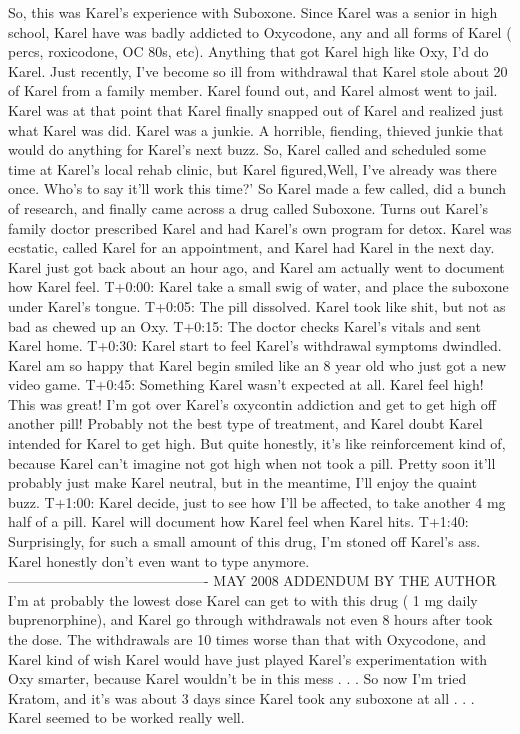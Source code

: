 \documentclass[12pt]{book}
\begin{document}
So, this was Karel's experience with Suboxone. Since Karel was a senior in high school, Karel have was badly addicted to Oxycodone, any and all forms of Karel ( percs, roxicodone, OC 80s, etc). Anything that got Karel high like Oxy, I'd do Karel. Just recently, I've become so ill from withdrawal that Karel stole about 20 of Karel from a family member. Karel found out, and Karel almost went to jail. Karel was at that point that Karel finally snapped out of Karel and realized just what Karel was did. Karel was a junkie. A horrible, fiending, thieved junkie that would do anything for Karel's next buzz. So, Karel called and scheduled some time at Karel's local rehab clinic, but Karel figured,Well, I've already was there once. Who's to say it'll work this time?' So Karel made a few called, did a bunch of research, and finally came across a drug called Suboxone. Turns out Karel's family doctor prescribed Karel and had Karel's own program for detox. Karel was ecstatic, called Karel for an appointment, and Karel had Karel in the next day. Karel just got back about an hour ago, and Karel am actually went to document how Karel feel. T+0:00: Karel take a small swig of water, and place the suboxone under Karel's tongue. T+0:05: The pill dissolved. Karel took like shit, but not as bad as chewed up an Oxy. T+0:15: The doctor checks Karel's vitals and sent Karel home. T+0:30: Karel start to feel Karel's withdrawal symptoms dwindled. Karel am so happy that Karel begin smiled like an 8 year old who just got a new video game. T+0:45: Something Karel wasn't expected at all. Karel feel high! This was great! I'm got over Karel's oxycontin addiction and get to get high off another pill! Probably not the best type of treatment, and Karel doubt Karel intended for Karel to get high. But quite honestly, it's like reinforcement kind of, because Karel can't imagine not got high when not took a pill. Pretty soon it'll probably just make Karel neutral, but in the meantime, I'll enjoy the quaint buzz. T+1:00: Karel decide, just to see how I'll be affected, to take another 4 mg half of a pill. Karel will document how Karel feel when Karel hits. T+1:40: Surprisingly, for such a small amount of this drug, I'm stoned off Karel's ass. Karel honestly don't even want to type anymore. ------------------------------------------- MAY 2008 ADDENDUM BY THE AUTHOR I'm at probably the lowest dose Karel can get to with this drug ( 1 mg daily buprenorphine), and Karel go through withdrawals not even 8 hours after took the dose. The withdrawals are 10 times worse than that with Oxycodone, and Karel kind of wish Karel would have just played Karel's experimentation with Oxy smarter, because Karel wouldn't be in this mess . . .  So now I'm tried Kratom, and it's was about 3 days since Karel took any suboxone at all . . .  Karel seemed to be worked really well.
\end{document}
